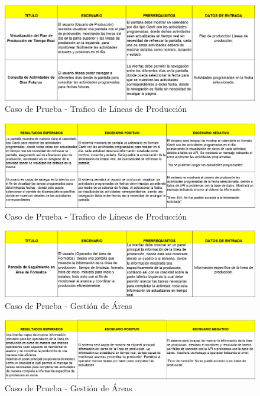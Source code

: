 \documentclass[12pt,letterpaper,spanish, xcolor=table]{report}
\numberwithin{figure}{subsection}
\begin{document}
	\begin{figure}[H]
		\centering
		\includegraphics[width=1.0\textwidth]
		{Imagenes/PathAyuda/CPLineaProduccion.png}
		\caption{Caso de Prueba - Trafico de Líneas de Producción
		}\label{a2}
	\end{figure}
	
	\begin{figure}[H]
		\centering
		\includegraphics[width=1.0\textwidth]
		{Imagenes/PathAyuda/CPLineaProduccion2.png}
		\caption{Caso de Prueba - Trafico de Líneas de Producción
		}\label{a2}
	\end{figure}
	
	\begin{figure}[H]
		\centering
		\includegraphics[width=1.0\textwidth]
		{Imagenes/PathAyuda/CPGestionArea.png}
		\caption{Caso de Prueba - Gestión de Áreas
		}\label{a2}
	\end{figure}
	
	\begin{figure}[H]
		\centering
		\includegraphics[width=1.0\textwidth]
		{Imagenes/PathAyuda/CPGestionArea2.png}
		\caption{Caso de Prueba - Gestión de Áreas
		}\label{a2}
	\end{figure}
	
\end{document}
